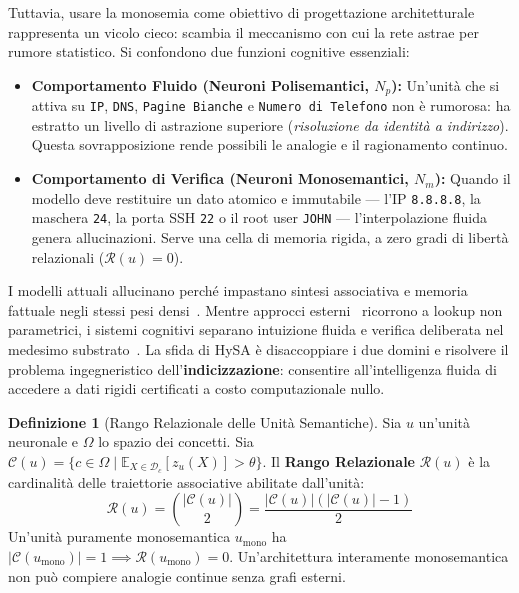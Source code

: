 \documentclass[10pt,twocolumn]{article}
\theoremstyle{definition}
\newtheorem{definizione}{Definizione}
\begin{document}
Tuttavia, usare la monosemia come obiettivo di progettazione architetturale rappresenta un vicolo cieco: scambia il meccanismo con cui la rete astrae per rumore statistico. Si confondono due funzioni cognitive essenziali:
\begin{itemize}[leftmargin=*, itemsep=1.5pt, topsep=1.5pt]
    \item \textbf{Comportamento Fluido (Neuroni Polisemantici, $N_p$):} Un'unità che si attiva su \texttt{IP}, \texttt{DNS}, \texttt{Pagine Bianche} e \texttt{Numero di Telefono} non è rumorosa: ha estratto un livello di astrazione superiore (\textit{risoluzione da identità a indirizzo}). Questa sovrapposizione rende possibili le analogie e il ragionamento continuo.
    \item \textbf{Comportamento di Verifica (Neuroni Monosemantici, $N_m$):} Quando il modello deve restituire un dato atomico e immutabile — l'IP \texttt{8.8.8.8}, la maschera \texttt{24}, la porta SSH \texttt{22} o il root user \texttt{JOHN} — l'interpolazione fluida genera allucinazioni. Serve una cella di memoria rigida, a zero gradi di libertà relazionali ($\mathcal{R}(u)=0$).
\end{itemize}

I modelli attuali allucinano perché impastano sintesi associativa e memoria fattuale negli stessi pesi densi~\cite{geva2021transformer, meng2022locating_rome}. Mentre approcci esterni~\cite{khandelwal2020knn_lm} ricorrono a lookup non parametrici, i sistemi cognitivi separano intuizione fluida e verifica deliberata nel medesimo substrato~\cite{kahneman2011thinking}. La sfida di HySA è disaccoppiare i due domini e risolvere il problema ingegneristico dell'\textbf{indicizzazione}: consentire all'intelligenza fluida di accedere a dati rigidi certificati a costo computazionale nullo.

\begin{definizione}[Rango Relazionale delle Unità Semantiche]
Sia $u$ un'unità neuronale e $\Omega$ lo spazio dei concetti. Sia $\mathcal{C}(u) = \{c \in \Omega \mid \mathbb{E}_{X \in \mathcal{D}_c}[z_u(X)] > \theta\}$. Il \textbf{Rango Relazionale} $\mathcal{R}(u)$ è la cardinalità delle traiettorie associative abilitate dall'unità:
\begin{equation}
    \mathcal{R}(u) = \binom{|\mathcal{C}(u)|}{2} = \frac{|\mathcal{C}(u)| (|\mathcal{C}(u)| - 1)}{2}
\end{equation}
Un'unità puramente monosemantica $u_{\mathrm{mono}}$ ha $|\mathcal{C}(u_{\mathrm{mono}})| = 1 \implies \mathcal{R}(u_{\mathrm{mono}}) = 0$. Un'architettura interamente monosemantica non può compiere analogie continue senza grafi esterni.
\end{definizione}
\end{document}
